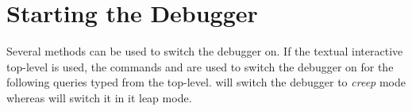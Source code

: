%
%
%
%


\section{Starting the Debugger}

Several methods can be used to switch the debugger on.
If the textual interactive top-level is used, the commands
 and
 are used to
switch the debugger on for the following queries typed from the
top-level.
 will switch the
debugger to {\it creep} mode whereas
 will switch it
in {it leap} mode. 

